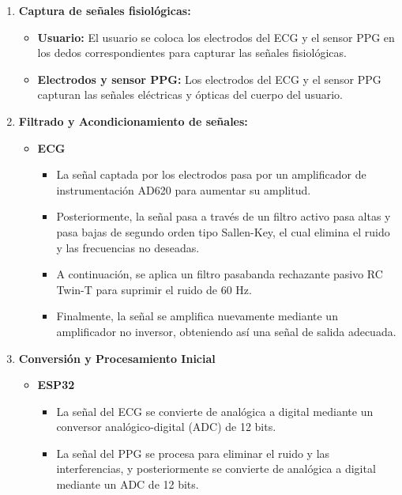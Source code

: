     \begin{enumerate}
        \item \textbf{Captura de señales fisiológicas:}
            \begin{itemize}
                \item \textbf{Usuario:} El usuario se coloca los electrodos del ECG y el sensor PPG en los dedos correspondientes para capturar las señales fisiológicas.
                \item \textbf{Electrodos y sensor PPG:} Los electrodos del ECG y el sensor PPG capturan las señales eléctricas y ópticas del cuerpo del usuario.
            \end{itemize}
        \item \textbf{Filtrado y Acondicionamiento de señales:}
            \begin{itemize}
                \item \textbf{ECG}
                    \begin{itemize}
                        \item La señal captada por los electrodos pasa por un amplificador de instrumentación AD620 para aumentar su amplitud.
                        \item Posteriormente, la señal pasa a través de un filtro activo pasa altas y pasa bajas de segundo orden tipo Sallen-Key, el cual elimina el ruido y las frecuencias no deseadas.
                        \item A continuación, se aplica un filtro pasabanda rechazante pasivo RC Twin-T para suprimir el ruido de 60 Hz.
                        \item Finalmente, la señal se amplifica nuevamente mediante un amplificador no inversor, obteniendo así una señal de salida adecuada.
                    \end{itemize}
            \end{itemize}
        \item \textbf{Conversión y Procesamiento Inicial}
            \begin{itemize}
                \item \textbf{ESP32}
                    \begin{itemize}
                        \item La señal del ECG se convierte de analógica a digital mediante un conversor analógico-digital (ADC) de 12 bits.
                        \item La señal del PPG se procesa para eliminar el ruido y las interferencias, y posteriormente se convierte de analógica a digital mediante un ADC de 12 bits.

\end{itemize}
\end{itemize}
\end{enumerate}
